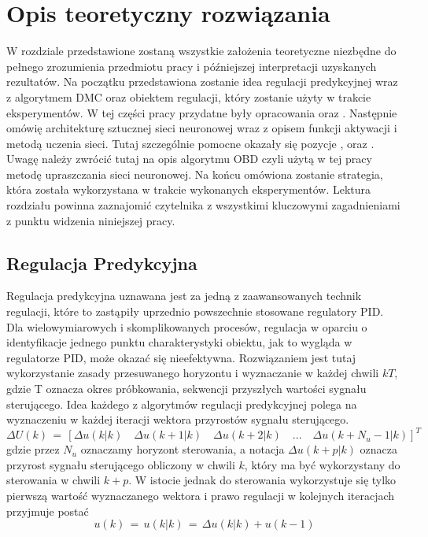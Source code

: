 \newpage %
\section{Opis teoretyczny rozwiązania}
W rozdziale przedstawione zostaną wszystkie założenia teoretyczne niezbędne do pełnego zrozumienia przedmiotu pracy i późniejszej interpretacji uzyskanych rezultatów. Na początku przedstawiona zostanie idea regulacji predykcyjnej wraz z algorytmem DMC oraz obiektem regulacji, który zostanie użyty w trakcie eksperymentów. W tej części pracy przydatne były opracowania \cite{stp2009} oraz \cite{tatjewski2016}. Następnie omówię architekturę sztucznej sieci neuronowej wraz z opisem funkcji aktywacji i metodą uczenia sieci. Tutaj szczególnie pomocne okazały się pozycje \cite{nielsen2015}, \cite{osowski2013} oraz \cite{wawrzynski2019}. Uwagę należy zwrócić tutaj na opis algorytmu OBD czyli użytą w tej pracy metodę upraszczania sieci neuronowej. Na końcu omówiona zostanie strategia, która została wykorzystana w trakcie wykonanych eksperymentów. Lektura rozdziału powinna zaznajomić czytelnika z wszystkimi kluczowymi zagadnieniami z punktu widzenia niniejszej pracy.

\subsection{Regulacja Predykcyjna}
Regulacja predykcyjna uznawana jest za jedną z zaawansowanych technik regulacji, które to zastąpiły uprzednio powszechnie stosowane regulatory PID. Dla wielowymiarowych i skomplikowanych procesów, regulacja w oparciu o identyfikacje jednego punktu charakterystyki obiektu, jak to wygląda w regulatorze PID, może okazać się nieefektywna. Rozwiązaniem jest tutaj wykorzystanie zasady przesuwanego horyzontu i wyznaczanie w każdej chwili \(kT\), gdzie T oznacza okres próbkowania, sekwencji przyszłych wartości sygnału sterującego. Idea każdego z algorytmów regulacji predykcyjnej polega na wyznaczeniu w każdej iteracji wektora przyrostów sygnału sterującego.
\begin{equation}
\Delta U(k) \, = \, [\Delta u(k|k)\quad \Delta u(k+1|k)\quad \Delta u(k+2|k)\quad ... \quad \Delta u(k + N_u - 1|k)]^T
\end{equation}
gdzie przez \(N_u\) oznaczamy horyzont sterowania, a notacja \(\Delta u(k+p|k)\) oznacza przyrost sygnału sterującego obliczony w chwili \(k\), który ma być wykorzystany do sterowania w chwili \(k+p\). W istocie jednak do sterowania wykorzystuje się tylko pierwszą wartość wyznaczanego wektora i prawo regulacji w kolejnych iteracjach przyjmuje postać
\begin{equation}
u(k) \, = \, u(k|k) \, = \, \Delta u(k|k) + u(k-1)
\end{equation}


